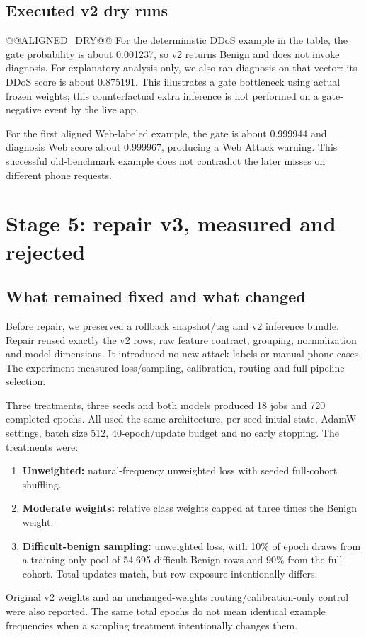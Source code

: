 \documentclass[11pt,a4paper,oneside]{report}
\begin{document}
\section{Executed v2 dry runs}
@@ALIGNED_DRY@@
For the deterministic DDoS example in the table, the gate probability is about 0.001237, so v2 returns Benign and does not invoke diagnosis. For explanatory analysis only, we also ran diagnosis on that vector: its DDoS score is about 0.875191. This illustrates a gate bottleneck using actual frozen weights; this counterfactual extra inference is not performed on a gate-negative event by the live app.

For the first aligned Web-labeled example, the gate is about 0.999944 and diagnosis Web score about 0.999967, producing a Web Attack warning. This successful old-benchmark example does not contradict the later misses on different phone requests.

\chapter{Stage 5: repair v3, measured and rejected}
\section{What remained fixed and what changed}
Before repair, we preserved a rollback snapshot/tag and v2 inference bundle. Repair reused exactly the v2 rows, raw feature contract, grouping, normalization and model dimensions. It introduced no new attack labels or manual phone cases. The experiment measured loss/sampling, calibration, routing and full-pipeline selection.

Three treatments, three seeds and both models produced 18 jobs and 720 completed epochs. All used the same architecture, per-seed initial state, AdamW settings, batch size 512, 40-epoch/update budget and no early stopping. The treatments were:
\begin{enumerate}
\item \textbf{Unweighted:} natural-frequency unweighted loss with seeded full-cohort shuffling.
\item \textbf{Moderate weights:} relative class weights capped at three times the Benign weight.
\item \textbf{Difficult-benign sampling:} unweighted loss, with 10\% of epoch draws from a training-only pool of 54,695 difficult Benign rows and 90\% from the full cohort. Total updates match, but row exposure intentionally differs.
\end{enumerate}
Original v2 weights and an unchanged-weights routing/calibration-only control were also reported. The same total epochs do not mean identical example frequencies when a sampling treatment intentionally changes them.
\end{document}
